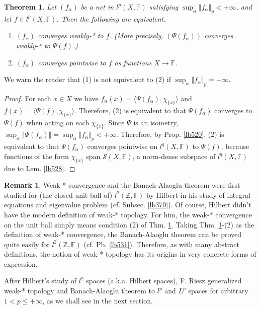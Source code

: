\documentclass[12pt,b5paper,notitlepage]{article}
\theoremstyle{definition}
\newtheorem{rem}[df]{Remark}
\theoremstyle{plain}
\newtheorem{thm}[df]{Theorem}
\newcommand{\mc}{\mathcal}
\newcommand{\bk}[1]{\langle {#1}\rangle}
\newcommand{\Zbb}{\mathbb Z}
\newcommand{\Fbb}{\mathbb F}
\numberwithin{equation}{section}
\begin{document}
\begin{thm}\label{lb530}
Let $(f_\alpha)$ be a net in $l^p(X,\Fbb)$ satisfying $\sup_\alpha\Vert f_\alpha\Vert_p<+\infty$, and let $f\in l^p(X,\Fbb)$. Then the following are equivalent.
\begin{enumerate}[label=(\arabic*)]
\item $(f_\alpha)$ converges weakly-* to $f$. (More precisely, $(\Psi(f_\alpha))$ converges weakly-* to $\Psi(f)$.)
\item $(f_\alpha)$ converges pointwise to $f$ as functions $X\rightarrow\Fbb$.
\end{enumerate}
\end{thm}

We warn the reader that (1) is not equivalent to (2) if $\sup_\alpha\Vert f_\alpha\Vert_p=+\infty$.

\begin{proof}
For each $x\in X$ we have $f_\alpha(x)=\bk{\Psi(f_\alpha),\chi_{\{x\}}}$ and $f(x)=\bk{\Psi(f),\chi_{\{x\}}}$. Therefore, (2) is equivalent to that $\Psi(f_\alpha)$ converges to $\Psi(f)$ when acting on each $\chi_{\{x\}}$.  Since $\Psi$ is an isometry, $\sup_\alpha \Vert\Psi(f_\alpha)\Vert=\sup_\alpha\Vert f_\alpha\Vert_p<+\infty$. Therefore, by Prop. \ref{lb520}, (2) is equivalent to that $\Psi(f_\alpha)$ converges pointwise on $l^q(X,\Fbb)$ to $\Psi(f)$, because functions of the form $\chi_{\{x\}}$ span $\mc S(X,\Fbb)$, a norm-dense subspace of $l^q(X,\Fbb)$ due to Lem. \ref{lb528}.
\end{proof}


\begin{rem}
Weak-* convergence and the Banach-Alaoglu theorem were first studied for (the closed unit ball of) $l^2(\Zbb,\Fbb)$ by Hilbert in his study of integral equations and eigenvalue problem (cf. Subsec. \ref{lb370}). Of course, Hilbert didn't have the modern definition of weak-* topology. For him, the weak-* convergence on the unit ball simply means condition (2) of Thm. \ref{lb530}. Taking Thm. \ref{lb530}-(2) as the definition of weak-* convergence, the Banach-Alaoglu theorem can be proved quite easily for $l^2(\Zbb,\Fbb)$ (cf. Pb. \ref{lb531}). Therefore, as with many abstract definitions, the notion of weak-* topology has its origins in very concrete forms of expression. 
\end{rem}

After Hilbert's study of $l^2$ spaces (a.k.a. Hilbert spaces), F. Riesz generalized weak-* topology and Banach-Alaoglu theorem to $l^p$ and $L^p$ spaces for arbitrary $1<p\leq+\infty$, as we shall see in the next section.
\end{document}
